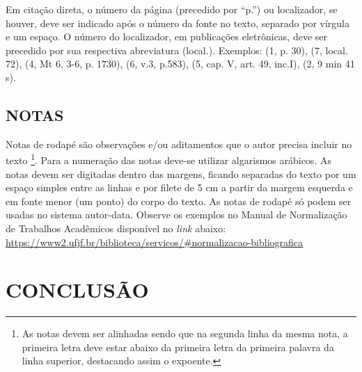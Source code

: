 \documentclass[
        oneside,      %
        english,			
        brazil			 
        ]{abntbibufjf}
\begin{document}
Em citação direta, o número da página (precedido por ``p.'') ou localizador, se houver, deve ser indicado após o número da fonte no texto, separado por vírgula e um espaço. O número do localizador, em publicações eletrônicas, deve ser precedido por sua respectiva abreviatura (local.). Exemplos: (1, p. 30), (7, local. 72), (4, Mt 6, 3-6, p. 1730), (6, v.3, p.583), (5, cap. V, art. 49, inc.I), (2, 9 min 41 s).

\section{NOTAS} %

Notas de rodap\'e s\~ao observa\c{c}\~{o}es e/ou aditamentos que o autor precisa incluir no texto \footnote[2]{As notas devem ser alinhadas sendo que na segunda linha da mesma nota, a primeira letra deve estar abaixo da primeira letra da primeira palavra da linha superior, destacando assim o expoente.}. Para a numera\c{c}\~{a}o das notas deve-se utilizar algarismos ar\'abicos. As notas devem ser digitadas dentro das margens, ficando separadas do texto por um espa\c{c}o simples entre as linhas e por filete de 5 cm a partir da margem esquerda e em fonte menor (um ponto) do corpo do texto. As notas de rodap\'e s\'o podem ser usadas no sistema autor-data. Observe os exemplos no Manual de Normaliza\c{c}\~{a}o de Trabalhos Acad\^emicos dispon\'ivel no \textit{link} abaixo: \\
\url{https://www2.ufjf.br/biblioteca/servicos/#normalizacao-bibliografica}




\chapter{CONCLUS\~AO} %
\end{document}
